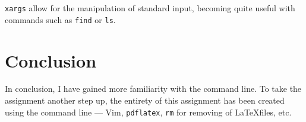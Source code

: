 \documentclass{article}
\newcommand{\shellcmd}[1]{\texttt{\colorbox{gray!30}{#1}}}
\begin{document}
\shellcmd{xargs} allow for the manipulation of standard input, becoming quite useful with commands such as \shellcmd{find} or \shellcmd{ls}.

\section{Conclusion}
In conclusion, I have gained more familiarity with the command line. To take the assignment another step up, the entirety of this assignment has been created using the command line — Vim, \texttt{pdflatex}, \texttt{rm} for removing of \LaTeX files, etc.
\end{document}
